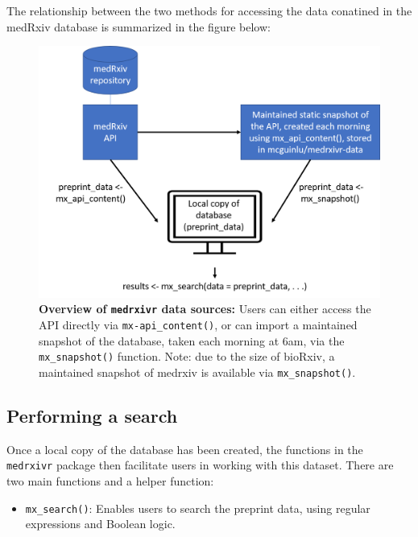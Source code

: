 \documentclass[a4paper, twoside]{templates/ociamthesis}
\providecommand{\tightlist}{%
  \setlength{\itemsep}{0pt}\setlength{\parskip}{0pt}}
\begin{document}
The relationship between the two methods for accessing the data conatined in the medRxiv database is summarized in the figure below:





\begin{figure}
\includegraphics[width=1\linewidth]{figures/sys-rev-tools/data_sources} \caption[Overview of \texttt{medrxivr} data sources]{\textbf{Overview of \texttt{medrxivr} data sources:} Users can either access the API directly via \texttt{mx-api\_content()}, or can import a maintained snapshot of the database, taken each morning at 6am, via the \texttt{mx\_snapshot()} function. Note: due to the size of bioRxiv, a maintained snapshot of medrxiv is available via \texttt{mx\_snapshot()}.}\label{fig:medrxivr-data-sources}
\end{figure}

\hypertarget{performing-a-search}{%
\subsection{Performing a search}\label{performing-a-search}}

Once a local copy of the database has been created, the functions in the \texttt{medrxivr} package then facilitate users in working with this dataset. There are two main functions and a helper function:

\begin{itemize}
\tightlist
\item
  \texttt{mx\_search()}: Enables users to search the preprint data, using regular expressions and Boolean logic.
\end{itemize}
\end{document}
